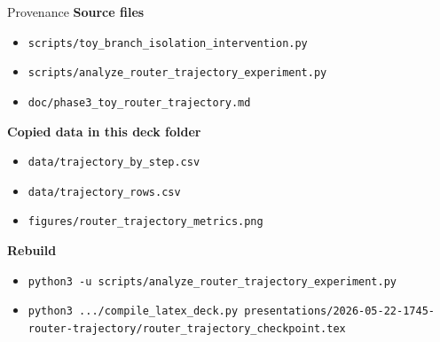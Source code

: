 \documentclass[aspectratio=169]{beamer}
\begin{document}
\begin{frame}{Provenance}
  \small
  \textbf{Source files}
  \begin{itemize}
    \item \texttt{scripts/toy\_branch\_isolation\_intervention.py}
    \item \texttt{scripts/analyze\_router\_trajectory\_experiment.py}
    \item \texttt{doc/phase3\_toy\_router\_trajectory.md}
  \end{itemize}

  \vspace{0.4em}
  \textbf{Copied data in this deck folder}
  \begin{itemize}
    \item \texttt{data/trajectory\_by\_step.csv}
    \item \texttt{data/trajectory\_rows.csv}
    \item \texttt{figures/router\_trajectory\_metrics.png}
  \end{itemize}

  \vspace{0.4em}
  \textbf{Rebuild}
  \begin{itemize}
    \item \texttt{python3 -u scripts/analyze\_router\_trajectory\_experiment.py}
    \item \texttt{python3 .../compile\_latex\_deck.py presentations/2026-05-22-1745-router-trajectory/router\_trajectory\_checkpoint.tex}
  \end{itemize}
\end{frame}
\end{document}
